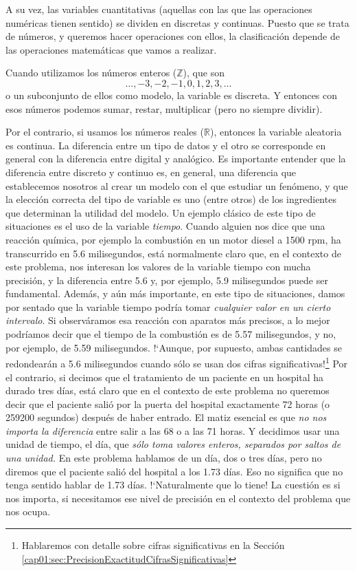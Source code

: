A su vez, las variables cuantitativas (aquellas con las que las operaciones numéricas tienen sentido) se dividen en  {\sf discretas} y {\sf continuas}. Puesto
que se trata de números, y queremos hacer operaciones con ellos, la
clasificación depende de las operaciones matemáticas que vamos a realizar.

Cuando utilizamos los {\sf números enteros} ($\mathbb Z$), que son
\[\ldots,-3,-2,-1,0,1,2,3,\ldots \]
o un subconjunto de ellos como modelo, la variable es discreta. Y entonces con esos
números podemos sumar, restar, multiplicar (pero no siempre dividir).

Por el contrario, si usamos {\sf los números reales} ($\mathbb R$),
entonces la variable aleatoria es continua. La diferencia entre un tipo de datos
y el otro se corresponde en general con la diferencia entre digital y analógico.
Es importante entender que la diferencia entre discreto y continuo es,
en general, una diferencia que establecemos nosotros al crear un {\sf
modelo} con el que estudiar un fenómeno, y que la elección correcta del tipo de variable es uno (entre otros) de los ingredientes que determinan la
utilidad del modelo. Un ejemplo clásico de este tipo de situaciones es el uso de la variable {\em tiempo}. Cuando alguien nos dice que una
reacción química, por ejemplo la combustión en un motor diesel a 1500 rpm, ha transcurrido en 5.6 milisegundos, está normalmente claro que, en el
contexto de este problema, nos interesan los valores de la variable tiempo con mucha precisión, y la diferencia entre 5.6 y, por ejemplo, 5.9
milisegundos puede ser fundamental. Además, y aún más importante, en este tipo de situaciones, damos por sentado que la variable tiempo podría tomar
{\em cualquier valor en un cierto intervalo}. Si observáramos esa reacción con aparatos más precisos, a lo mejor podríamos decir que el tiempo de la
combustión es de 5.57 milisegundos, y no, por ejemplo, de 5.59 milisegundos. {!`}Aunque, por supuesto, ambas cantidades se redondearán a 5.6 milisegundos
cuando sólo se usan dos cifras significativas!\footnote{Hablaremos con detalle sobre cifras significativas en la Sección \ref{cap01:sec:PrecisionExactitudCifrasSignificativas}} Por el contrario, si decimos que el tratamiento de un paciente en un hospital ha durado
tres días, está claro que en el contexto de este problema no queremos decir que el paciente salió por la puerta del hospital exactamente 72 horas (o
259200 segundos) después de haber entrado. El matiz esencial es que {\em no nos importa la diferencia} entre salir a las 68 o a las 71 horas. Y
decidimos usar una unidad de tiempo, el día, que {\em sólo toma valores enteros, separados por saltos de una unidad.} En este problema hablamos de un
día, dos o tres días, pero no diremos que el paciente salió del hospital a los 1.73 días. Eso no significa que no tenga sentido hablar de 1.73 días.
{!`}Naturalmente que lo tiene! La  cuestión es si nos importa, si necesitamos ese nivel de precisión en el contexto del problema que nos ocupa.\\


